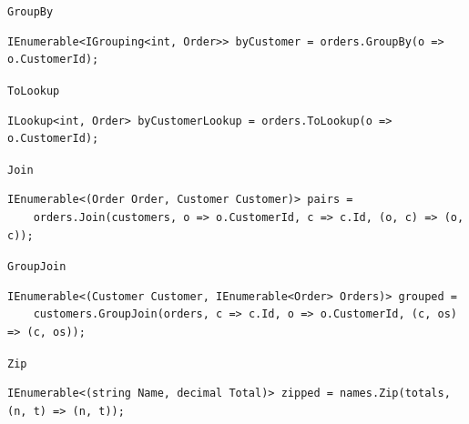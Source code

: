 \documentclass[aspectratio=169,10pt,t]{beamer}
\begin{document}
\begin{frame}[fragile]{\texttt{GroupBy}}
  \slidetop
\begin{lstlisting}[style=csharp,basicstyle=\ttfamily\fontsize{8.2}{9.6}\selectfont]
IEnumerable<IGrouping<int, Order>> byCustomer = orders.GroupBy(o => o.CustomerId);
\end{lstlisting}
  \slidegap
\end{frame}

\begin{frame}[fragile]{\texttt{ToLookup}}
  \slidetop
\begin{lstlisting}[style=csharp,basicstyle=\ttfamily\fontsize{8.2}{9.6}\selectfont]
ILookup<int, Order> byCustomerLookup = orders.ToLookup(o => o.CustomerId);
\end{lstlisting}
  \slidegap
\end{frame}

\begin{frame}[fragile]{\texttt{Join}}
  \slidetop
\begin{lstlisting}[style=csharp,basicstyle=\ttfamily\fontsize{8.2}{9.6}\selectfont]
IEnumerable<(Order Order, Customer Customer)> pairs =
    orders.Join(customers, o => o.CustomerId, c => c.Id, (o, c) => (o, c));
\end{lstlisting}
  \slidegap
\end{frame}

\begin{frame}[fragile]{\texttt{GroupJoin}}
  \slidetop
\begin{lstlisting}[style=csharp,basicstyle=\ttfamily\fontsize{8.2}{9.6}\selectfont]
IEnumerable<(Customer Customer, IEnumerable<Order> Orders)> grouped =
    customers.GroupJoin(orders, c => c.Id, o => o.CustomerId, (c, os) => (c, os));
\end{lstlisting}
\end{frame}

\begin{frame}[fragile]{\texttt{Zip}}
  \slidetop
\begin{lstlisting}[style=csharp,basicstyle=\ttfamily\fontsize{8.2}{9.6}\selectfont]
IEnumerable<(string Name, decimal Total)> zipped = names.Zip(totals, (n, t) => (n, t));
\end{lstlisting}
\end{frame}
\end{document}
